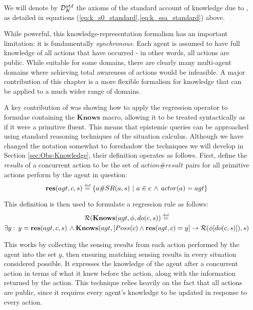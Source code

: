 \medskip{}


\begin{defn}
We will denote by $\mathcal{D}_{K}^{std}$ the axioms of the standard account
of knowledge due to \citet{scherl03sc_knowledge}, as detailed in
equations (\ref{eq:k_s0_standard},\ref{eq:k_ssa_standard}) above. 
\end{defn}
While powerful, this knowledge-representation formalism has an important
limitation: it is fundamentally \emph{synchronous.} Each agent is
assumed to have full knowledge of all actions that have occurred -
in other words, all actions are public. While suitable for some domains,
there are clearly many multi-agent domains where achieving total awareness
of actions would be infeasible. A major contribution of this chapter
is a more flexible formalism for knowledge that can be applied to
a much wider range of domains.

A key contribution of \citet{scherl03sc_knowledge} was showing how
to apply the regression operator to formulae containing the $\mathbf{Knows}$
macro, allowing it to be treated syntactically as if it were a primitive
fluent. This means that epistemic queries can be approached using
standard reasoning techniques of the situation calculus. Although
we have changed the notation somewhat to foreshadow the techniques
we will develop in Section \ref{sec:Obs-Knowledge}, their definition
operates as follows. First, define the \emph{results} of a concurrent
action to be the set of $action\#result$ pairs for all primitive
actions perform by the agent in question:\[
\mathbf{res}(agt,c,s)\stackrel{\mbox{\tiny def}}{=}\{a\#SR(a,s)\,\,|\,\, a\in c\,\wedge\, actor(a)=agt\}\]


This definition is then used to formulate a regression rule as follows:\begin{multline}
\mathcal{R}(\mathbf{Knows}(agt,\phi,do(c,s))\stackrel{\mbox{\tiny def}}{=}\\
\exists y:\, y=\mathbf{res}(agt,c,s)\,\wedge\mathbf{Knows}(agt,\left[Poss(c)\wedge\mathbf{res}(agt,c)=y\right]\rightarrow\mathcal{R}(\phi[do(c,s)]),s)\label{eq:reg_k_std}\end{multline}


This works by collecting the sensing results from each action performed
by the agent into the set $y$, then ensuring matching sensing results
in every situation considered possible. It expresses the knowledge
of the agent after a concurrent action in terms of what it knew before
the action, along with the information returned by the action. This
technique relies heavily on the fact that all actions are public,
since it requires every agent's knowledge to be updated in response
to every action.

